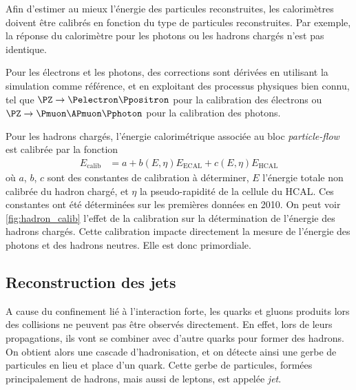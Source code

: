Afin d'estimer au mieux l'énergie des particules reconstruites, les calorimètres doivent être calibrés en fonction du type de particules reconstruites. Par exemple, la réponse du calorimètre pour les photons ou les hadrons chargés n'est pas identique.

Pour les électrons et les photons, des corrections sont dérivées en utilisant la simulation comme référence, et en exploitant des processus physiques bien connu, tel que $\PZ \rightarrow \Pelectron \Ppositron$ pour la calibration des électrons ou $\PZ \rightarrow \Pmuon \APmuon \Pphoton$ pour la calibration des photons.

Pour les hadrons chargés, l'énergie calorimétrique associée au bloc \emph{particle-flow} est calibrée par la fonction
\begin{align*}
  E_\text{calib} &= a + b\left(E, \eta\right) E_\text{ECAL} + c\left(E, \eta\right)E_\text{HCAL}
\end{align*}
où $a$, $b$, $c$ sont des constantes de calibration à déterminer, $E$ l'énergie totale non calibrée du hadron chargé, et $\eta$ la pseudo-rapidité de la cellule du HCAL. Ces constantes ont été déterminées sur les premières données en 2010. On peut voir \cref{fig:hadron_calib} l'effet de la calibration sur la détermination de l'énergie des hadrons chargés. Cette calibration impacte directement la mesure de l'énergie des photons et des hadrons neutres. Elle est donc primordiale.

\subsection{Reconstruction des jets} \label{sec:jet_reco}


A cause du confinement lié à l'interaction forte, les quarks et gluons produits lors des collisions ne peuvent pas être observés directement. En effet, lors de leurs propagations, ils vont se combiner avec d'autre quarks pour former des hadrons. On obtient alors une cascade d'hadronisation, et on détecte ainsi une gerbe de particules en lieu et place d'un quark. Cette gerbe de particules, formées principalement de hadrons, mais aussi de leptons, est appelée \emph{jet}. %

